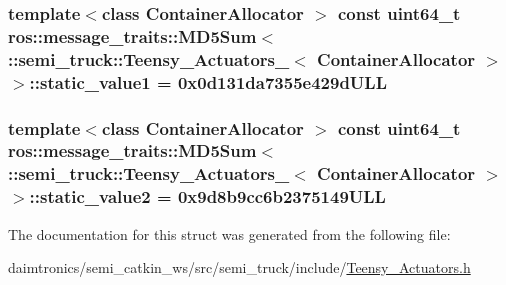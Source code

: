 \subsubsection[{\texorpdfstring{static\+\_\+value1}{static_value1}}]{\setlength{\rightskip}{0pt plus 5cm}template$<$class Container\+Allocator $>$ const uint64\+\_\+t ros\+::message\+\_\+traits\+::\+M\+D5\+Sum$<$ \+::{\bf semi\+\_\+truck\+::\+Teensy\+\_\+\+Actuators\+\_\+}$<$ Container\+Allocator $>$ $>$\+::static\+\_\+value1 = 0x0d131da7355e429d\+U\+LL\hspace{0.3cm}{\ttfamily [static]}}\hypertarget{structros_1_1message__traits_1_1_m_d5_sum_3_01_1_1semi__truck_1_1_teensy___actuators___3_01_container_allocator_01_4_01_4_a3b7b6fb0b62486fc31e42a45a16fd3c1}{}\label{structros_1_1message__traits_1_1_m_d5_sum_3_01_1_1semi__truck_1_1_teensy___actuators___3_01_container_allocator_01_4_01_4_a3b7b6fb0b62486fc31e42a45a16fd3c1}
\subsubsection[{\texorpdfstring{static\+\_\+value2}{static_value2}}]{\setlength{\rightskip}{0pt plus 5cm}template$<$class Container\+Allocator $>$ const uint64\+\_\+t ros\+::message\+\_\+traits\+::\+M\+D5\+Sum$<$ \+::{\bf semi\+\_\+truck\+::\+Teensy\+\_\+\+Actuators\+\_\+}$<$ Container\+Allocator $>$ $>$\+::static\+\_\+value2 = 0x9d8b9cc6b2375149\+U\+LL\hspace{0.3cm}{\ttfamily [static]}}\hypertarget{structros_1_1message__traits_1_1_m_d5_sum_3_01_1_1semi__truck_1_1_teensy___actuators___3_01_container_allocator_01_4_01_4_a9fd6a5beaa08b9601b1f2af0f1528164}{}\label{structros_1_1message__traits_1_1_m_d5_sum_3_01_1_1semi__truck_1_1_teensy___actuators___3_01_container_allocator_01_4_01_4_a9fd6a5beaa08b9601b1f2af0f1528164}


The documentation for this struct was generated from the following file\+:\begin{DoxyCompactItemize}
\item 
daimtronics/semi\+\_\+catkin\+\_\+ws/src/semi\+\_\+truck/include/\hyperlink{_teensy___actuators_8h}{Teensy\+\_\+\+Actuators.\+h}\end{DoxyCompactItemize}
